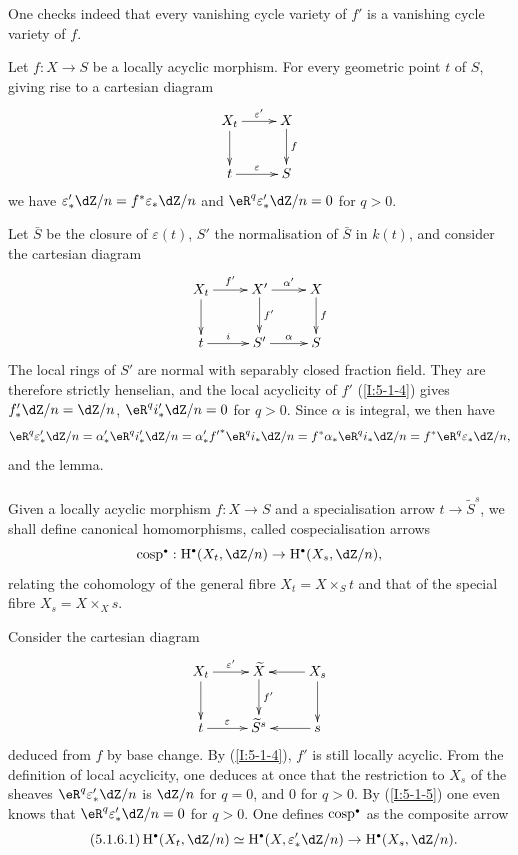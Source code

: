 One checks indeed that every vanishing cycle variety of $f'$ is
a vanishing cycle variety of $f$.	





\begin{lemma}\label{I:5-1-5}
Let $f:X\to S$ be a locally acyclic morphism. For every geometric point
$t$ of $S$, giving rise to a cartesian diagram
\[\xymatrix{
  X_t \ar[r]^-{\varepsilon'} \ar[d]
    & X \ar[d]^-f \\
  t \ar[r]^-\varepsilon
    & S
}\]
we have $\varepsilon_*' \dZ/n = f^*\varepsilon_* \dZ/n$ and $\eR^q \varepsilon_*'\dZ/n=0$
for $q>0$.
\end{lemma}

Let $\bar S$ be the closure of $\varepsilon(t)$, $S'$ the normalisation of $\bar S$
in $k(t)$, and consider the cartesian diagram
\[\xymatrix{
  X_t \ar[r]^-{f'} \ar[d]
    & X' \ar[r]^-{\alpha'} \ar[d]^-{f'}
    & X \ar[d]^-f \\
  t \ar[r]^-i
    & S' \ar[r]^-\alpha
    & S
}\]
The local rings of $S'$ are normal with separably closed fraction field.
They are therefore strictly henselian, and the local acyclicity of $f'$
(\ref{I:5-1-4}) gives $f_*'\dZ/n = \dZ/n$, $\eR^qi_*'\dZ/n = 0$ for $q>0$.
Since $\alpha$ is integral, we then have
\[
  \eR^q\varepsilon_*'\dZ/n
    = \alpha_*' \eR^q i_*' \dZ/n
    = \alpha_*' {f'}^* \eR^q i_* \dZ/n
    = f^* \alpha_* \eR^q i_* \dZ/n
    = f^* \eR^q \varepsilon_* \dZ/n \text{,}
\]
and the lemma. 





\subsubsection{}\label{I:5-1-6}

Given a locally acyclic morphism $f:X\to S$ and a specialisation arrow
$t\to \widetilde S^s$, we shall define canonical
homomorphisms, called cospecialisation arrows
\[
  \cosp^\bullet : \h^\bullet(X_t,\dZ/n) \to \h^\bullet(X_s,\dZ/n)\text{,}
\]
relating the cohomology of the general fibre $X_t=X\times_S t$ and that of the
special fibre $X_s=X\times_X s$.

Consider the cartesian diagram
\[\xymatrix{
  X_t \ar[d] \ar[r]^-{\varepsilon'}
    & \widetilde X \ar[d]^-{f'}
    & \ar[l] X_s \ar[d] \\
  t \ar[r]^-\varepsilon
    & \widetilde S^s
    & \ar[l] s
}\]
deduced from $f$ by base change. By (\ref{I:5-1-4}), $f'$ is still
locally acyclic. From the definition of local acyclicity, one deduces
at once that the restriction to $X_s$ of the sheaves $\eR^q \varepsilon_*' \dZ/n$
is $\dZ/n$ for $q=0$, and $0$ for $q>0$. By (\ref{I:5-1-5}) one even knows that
$\eR^q \varepsilon_*'\dZ/n = 0$ for $q>0$. One defines $\cosp^\bullet$ as the
composite arrow 
\begin{equation*}\tag{5.1.6.1}\label{I:eq:5-1-6-1}
  \h^\bullet(X_t,\dZ/n) \simeq \h^\bullet(X,\varepsilon_*' \dZ/n) \to \h^\bullet(X_s,\dZ/n) \text{.}
\end{equation*}

